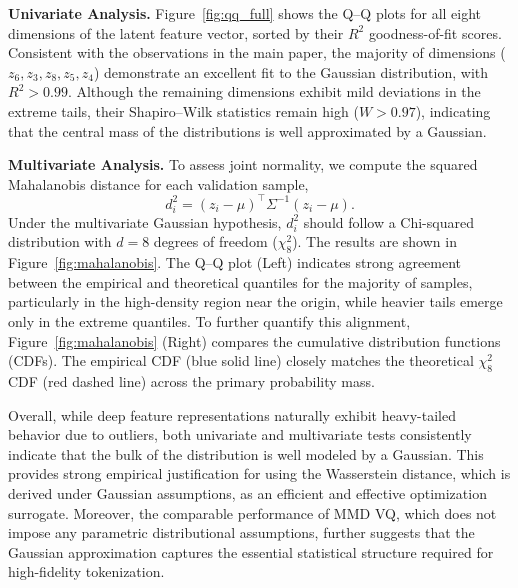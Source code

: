 \textbf{Univariate Analysis.} 
Figure~\ref{fig:qq_full} shows the Q--Q plots for all eight dimensions of the latent feature vector, sorted by their $R^2$ goodness-of-fit scores. Consistent with the observations in the main paper, the majority of dimensions ($z_6, z_3, z_8, z_5, z_4$) demonstrate an excellent fit to the Gaussian distribution, with $R^2 > 0.99$. Although the remaining dimensions exhibit mild deviations in the extreme tails, their Shapiro--Wilk statistics remain high ($W > 0.97$), indicating that the central mass of the distributions is well approximated by a Gaussian.

\textbf{Multivariate Analysis.} 
To assess joint normality, we compute the squared Mahalanobis distance for each validation sample,
\[
d_i^2 = (z_i - \mu)^\top \Sigma^{-1} (z_i - \mu).
\]
Under the multivariate Gaussian hypothesis, $d_i^2$ should follow a Chi-squared distribution with $d=8$ degrees of freedom ($\chi^2_8$). The results are shown in Figure~\ref{fig:mahalanobis}. The Q--Q plot (Left) indicates strong agreement between the empirical and theoretical quantiles for the majority of samples, particularly in the high-density region near the origin, while heavier tails emerge only in the extreme quantiles. To further quantify this alignment, Figure~\ref{fig:mahalanobis} (Right) compares the cumulative distribution functions (CDFs). The empirical CDF (blue solid line) closely matches the theoretical $\chi^2_8$ CDF (red dashed line) across the primary probability mass.

Overall, while deep feature representations naturally exhibit heavy-tailed behavior due to outliers, both univariate and multivariate tests consistently indicate that the bulk of the distribution is well modeled by a Gaussian. This provides strong empirical justification for using the Wasserstein distance, which is derived under Gaussian assumptions, as an efficient and effective optimization surrogate. Moreover, the comparable performance of MMD VQ, which does not impose any parametric distributional assumptions, further suggests that the Gaussian approximation captures the essential statistical structure required for high-fidelity tokenization.

